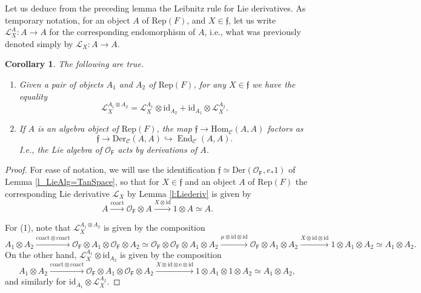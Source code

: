 \documentclass{amsart}
\newtheorem{Cor}[Thm]{Corollary}
\theoremstyle{definition}
\newcommand{\OOF}{\OO_{\mathsf{F}}}
\newcommand{\Rep}{\on{Rep}}
\newcommand{\sC}{\mathscr{C}}
\newcommand{\OO}{\mathscr{O}}
\newcommand{\Hom}{\on{Hom}}
\newcommand{\on}{\mathrm}
\newcommand{\ff}{\mathfrak{f}}
\newcommand{\End}{\operatorname{End}}
\numberwithin{equation}{section}
\begin{document}
{
Let us deduce from the preceding lemma the Leibnitz rule for Lie derivatives. As temporary notation, for an object $A$ of $\Rep(F)$, and $X \in \ff$, let us write $\mathscr{L}_X^A: A \rightarrow A$ for the corresponding endomorphism of $A$, i.e., what was previously denoted simply by $\mathscr{L}_X: A \rightarrow A$. 


\begin{Cor} The following are true. 
\begin{enumerate}
 
\item Given a pair of objects $A_1$ and $A_2$ of $\Rep(F)$, for any $X \in \ff$ we have the equality $$\mathscr{L}^{A_1 \otimes A_2}_X = \mathscr{L}^{A_1}_X \otimes \on{id}_{A_2} + \on{id}_{A_1} \otimes \mathscr{L}^{A_2}_X.$$

\item If $A$ is an algebra object of $\Rep(F)$, the map $\ff \rightarrow \Hom_{\sC}(A,A)$ factors as 
$$\ff \rightarrow \on{Der}_\sC(A, A) \hookrightarrow \End_\sC(A,A).$$
I.e., the Lie algebra of $\OOF$ acts by derivations of $A$. 

\end{enumerate} 
\end{Cor}

\begin{proof} For ease of notation, we will use the identification $\ff \simeq \on{Der}(\OOF, e_* 1)$ of Lemma \ref{l_LieAlg=TanSpace}, so that for $X \in \ff$ and an object $A$ of $\Rep(F)$ the corresponding Lie derivative $\mathscr{L}_X$ by Lemma \ref{l:Liederiv} is given by 
$$A \xrightarrow{\on{coact}} \OOF \otimes A \xrightarrow{X \otimes \on{id}} 1 \otimes A \simeq A.$$



For (1), note that $\mathscr{L}^{A_1 \otimes A_2}_X$ is given by the composition
$$A_1 \otimes A_2 \xrightarrow{\on{coact} \otimes \on{coact}} \OOF \otimes A_1 \otimes \OOF \otimes A_2 \simeq \OOF \otimes \OOF \otimes A_1 \otimes A_2 \xrightarrow{\mu \otimes \on{id} \otimes \on{id}} \OOF \otimes A_1 \otimes A_2 \xrightarrow{X \otimes \on{id} \otimes \on{id}} 1 \otimes A_1 \otimes A_2 \simeq A_1 \otimes A_2.$$
On the other hand, $\mathscr{L}^{A_1}_X \otimes \on{id}_{A_2}$ 
is given by the composition 
$$A_1 \otimes A_2 \xrightarrow{\on{coact} \otimes \on{coact}} \OOF \otimes A_1 \otimes \OOF \otimes A_2 \xrightarrow{X \otimes \on{id} \otimes \on{e} \otimes \on{id}} 1 \otimes A_1 \otimes 1 \otimes A_2 \simeq A_1 \otimes A_2,$$
and similarly for $\on{id}_{A_1} \otimes \mathscr{L}^{A_2}_X$.



\end{proof}}
\end{document}
